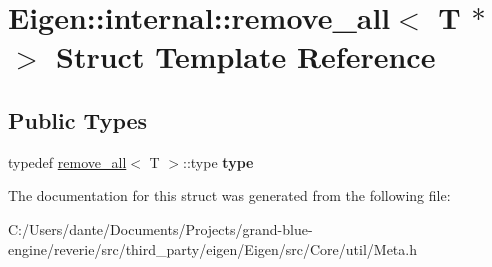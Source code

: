 \hypertarget{struct_eigen_1_1internal_1_1remove__all_3_01_t_01_5_01_4}{}\section{Eigen\+::internal\+::remove\+\_\+all$<$ T $\ast$ $>$ Struct Template Reference}
\label{struct_eigen_1_1internal_1_1remove__all_3_01_t_01_5_01_4}
\subsection*{Public Types}
\begin{DoxyCompactItemize}
\item 
\mbox{\label{struct_eigen_1_1internal_1_1remove__all_3_01_t_01_5_01_4_a5ea5cc87f92e865762fbffc491e8bac9}} 
typedef \mbox{\hyperlink{struct_eigen_1_1internal_1_1remove__all}{remove\+\_\+all}}$<$ T $>$\+::type {\bfseries type}
\end{DoxyCompactItemize}


The documentation for this struct was generated from the following file\+:\begin{DoxyCompactItemize}
\item 
C\+:/\+Users/dante/\+Documents/\+Projects/grand-\/blue-\/engine/reverie/src/third\+\_\+party/eigen/\+Eigen/src/\+Core/util/Meta.\+h\end{DoxyCompactItemize}
